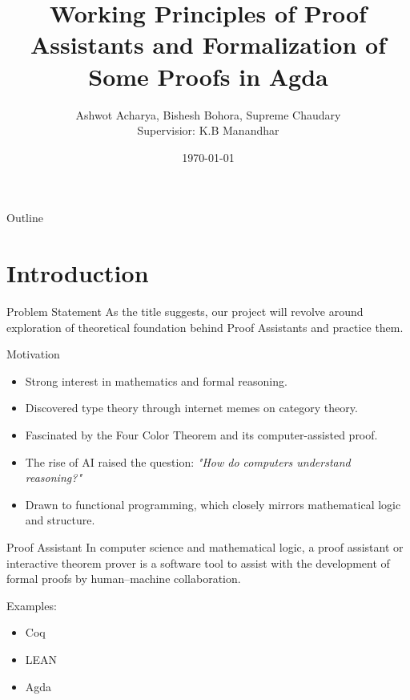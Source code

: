\documentclass{beamer}
\title{Working Principles of Proof Assistants and Formalization of Some Proofs in Agda}
\author{Ashwot Acharya, Bishesh Bohora, Supreme Chaudary \\Supervisior: K.B Manandhar}
\institute{Kathmandu University}
\date{\today}
\begin{document}
\begin{frame}
  \titlepage
\end{frame}

\begin{frame}{Outline}
  \tableofcontents
\end{frame}

\section{Introduction}

\begin{frame}{Problem Statement}
    As the title suggests, our project will revolve around exploration of theoretical foundation behind Proof Assistants and practice them.

    
\end{frame}
\begin{frame}{Motivation}
    \begin{itemize}
  \item Strong interest in mathematics and formal reasoning.
  \item Discovered type theory through internet memes on category theory.
  \item Fascinated by the Four Color Theorem and its computer-assisted proof.
  \item The rise of AI raised the question: \textit{"How do computers understand reasoning?"}
  \item Drawn to functional programming, which closely mirrors mathematical logic and structure.
    
\end{itemize}

\end{frame}
\begin{frame}{Proof Assistant}
        In computer science and mathematical logic, a proof assistant or interactive theorem prover is a software tool to assist with the development of formal proofs by human–machine collaboration.\cite{wikipedia_proof_assistant} 

        Examples:
        \begin{itemize}
            \item Coq
            \item LEAN 
            \item Agda
        \end{itemize}
\end{frame}
\end{document}
